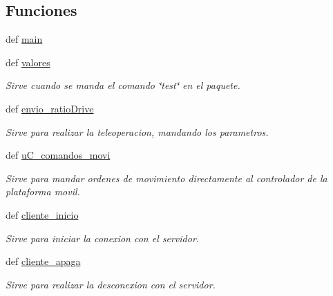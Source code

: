 \subsection*{Funciones}
\begin{DoxyCompactItemize}
\item 
def \hyperlink{namespacecliente__lib_afb746084e43cb9c21db470d7b4990cae}{main}
\item 
def \hyperlink{namespacecliente__lib_a8634914de8060e8f1b2b0415d66c4885}{valores}
\begin{DoxyCompactList}\small\item\em Sirve cuando se manda el comando \char`\"{}test\char`\"{} en el paquete. \end{DoxyCompactList}\item 
def \hyperlink{namespacecliente__lib_a5a38e309c8a912c3f6e26a2f8563036b}{envio\_\-ratioDrive}
\begin{DoxyCompactList}\small\item\em Sirve para realizar la teleoperacion, mandando los parametros. \end{DoxyCompactList}\item 
def \hyperlink{namespacecliente__lib_abf302612f8395b9ab23beb2fa49f3275}{uC\_\-comandos\_\-movi}
\begin{DoxyCompactList}\small\item\em Sirve para mandar ordenes de movimiento directamente al controlador de la plataforma movil. \end{DoxyCompactList}\item 
def \hyperlink{namespacecliente__lib_a60a5dc64680f8fafbaca76940d73111e}{cliente\_\-inicio}
\begin{DoxyCompactList}\small\item\em Sirve para iniciar la conexion con el servidor. \end{DoxyCompactList}\item 
def \hyperlink{namespacecliente__lib_a71376d64bf4550c98559a023e1464c48}{cliente\_\-apaga}
\begin{DoxyCompactList}\small\item\em Sirve para realizar la desconexion con el servidor. \end{DoxyCompactList}\end{DoxyCompactItemize}


